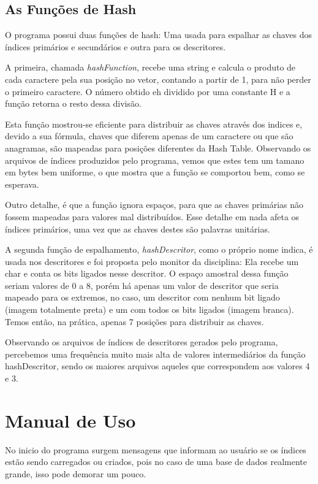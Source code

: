 \documentclass[10pt,a4paper,draft]{article}
\begin{document}
\subsection{As Funções de Hash}
O programa possui duas funções de hash: Uma usada para espalhar as chaves dos índices 
primários e secundários e outra para os descritores.

A primeira, chamada \textit{hashFunction}, recebe uma string e calcula o produto de cada caractere pela sua posição no vetor, contando a partir de 1, para não perder o primeiro caractere. O número obtido eh dividido por uma constante H e a função retorna o resto dessa divisão.

Esta função mostrou-se eficiente para distribuir as chaves através dos indices e, devido a sua fórmula, chaves que diferem apenas de um caractere ou que são anagramas, são mapeadas para posições diferentes da Hash Table. Observando os arquivos de índices produzidos pelo programa, vemos que estes tem um tamano em bytes bem uniforme, o que mostra que a função se comportou bem, como se esperava.

Outro detalhe, é que a função ignora espaços, para que as chaves primárias não fossem mapeadas para valores mal distribuídos. Esse detalhe em nada afeta os índices primários, uma vez que as chaves destes são palavras unitárias.

A segunda função de espalhamento, \textit{hashDescritor}, como o próprio nome indica, é usada nos descritores e foi proposta pelo monitor da disciplina: Ela recebe um char e conta os bits ligados nesse descritor. O espaço amostral dessa função seriam valores de 0 a 8, porém há apenas um valor de descritor que seria mapeado para os extremos, no caso, um descritor com nenhum bit ligado (imagem totalmente preta) e um com todos os bits ligados (imagem branca). Temos então, na prática, apenas 7 posições para distribuir as chaves.

Observando os arquivos de índices de descritores gerados pelo programa, percebemos uma frequência muito mais alta de valores intermediários da função hashDescritor, sendo os maiores arquivos aqueles que correspondem aos valores 4 e 3.

\newpage 
\section{Manual de Uso}
No inicio do programa surgem mensagens que informam ao usuário se os índices estão sendo carregados ou criados, pois no caso de uma base de dados realmente grande, isso pode demorar um pouco.
\end{document}
